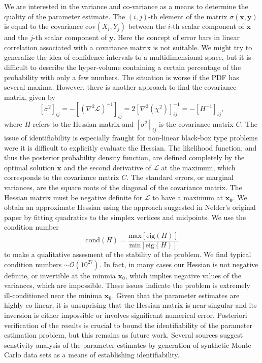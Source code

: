 \documentclass[12pt,a4paper,oneside]{book}
\begin{document}
We are interested in the variance and co-variance as a means to determine the quality of the parameter estimate. The $\left( i, j \right)$-th element of the matrix $\sigma (\mathbf{x}, \mathbf{y})$ is equal to the covariance $\mbox{cov}(X_i, Y_j)$ between the $i$-th scalar component of $\mathbf{x}$ and the $j$-th scalar component of $\mathbf{y}$. Here the concept of error bars in linear correlation associated with a covariance matrix is not suitable. We might try to generalize the idea of confidence intervals to a multidimensional space, but it is difficult to describe the hyper-volume containing a certain percentage of the probability with only a few numbers. The situation is worse if the PDF has several maxima. However, there is another approach to find the covariance matrix, given by
\[ \left[\sigma^2 \right]_{ij} = -\left[ \left( \nabla^2 \mathcal{L}\right)^{-1}\right]_{ij} = 2 \left[ \nabla^2 \left( \chi^2\right)\right]_{ij}^{-1} = -\left[H^{-1} \right]_{ij},\]
where $H$ refers to the Hessian matrix and $\left[\sigma^2 \right]_{ij}$ is the covariance matrix $C$. The issue of identifiability is especially fraught for non-linear black-box type problems were it is difficult to explicitly evaluate the Hessian. 
The likelihood function, and thus the posterior probability density function, are defined completely by the optimal solution $\mathbf{x}$ and the second derivative of $\mathcal{L}$ at the maximum, which corresponds to the covariance matrix $C$. The standard errors, or marginal variances, are the square roots of the diagonal of the covariance matrix. The Hessian matrix must be negative definite for $\mathcal{L}$ to have a maximum at $\mathbf{x_0}$. We obtain an approximate Hessian using the approach suggested in Nelder's original paper by fitting quadratics to the simplex vertices and midpoints\cite{nelder_simplex_1965}\cite{spendley_sequential_1962}. We use the condition number
\[ \mbox{cond} (H) = \frac{\mbox{max}[\mbox{eig}(H)]}{\mbox{min}[\mbox{eig}(H)]} \]
to make a qualitative assesment of the stability of the problem. We find typical condition numbers $\sim \mathcal{O}(10^{27})$. In fact, in many cases our Hessian is not negative definite, or invertible at the minmia $\mathbf{x}_0$, which implies negative values of the variances, which are impossible. These issues indicate the problem is extremely ill-conditioned near the minima $\mathbf{x_0}$. Given that the parameter estimates are highly co-linear, it is unsuprising that the Hessian matrix is near-singular and its inversion is either impossible or involves significant numerical error. Posteriori verification of the results is crucial to bound the identifiability of the parameter estimation problem, but this remains as future work. Several sources suggest senstivity analysis of the parameter estimates by generation of synthetic Monte Carlo data sets as a means of establishing identifiability\cite{bevington_data_1969}\cite{jaqaman_linking_2006}.
\end{document}
